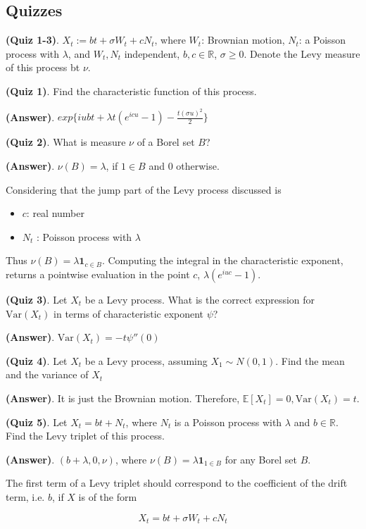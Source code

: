 \documentclass[12pt]{article}
\theoremstyle{nonumberbreak}
\begin{document}
\pagebreak
\subsection*{Quizzes}



\textbf{(Quiz 1-3)}. $X_t := bt + \sigma W_t + c N_t$, where $W_t$: Brownian motion, $N_t$: a Poisson process with $\lambda$, and $W_t, N_t$ independent, $b,c \in \mathbb{R}$, $\sigma \ge 0$. Denote the Levy measure of this process bt $\nu$.  


\textbf{(Quiz 1)}. Find the characteristic function of this process.

\textbf{(Answer)}. $exp \{ iubt + \lambda t (e^{icu} - 1) - \frac{t(\sigma u)^2}{2} \}$


\textbf{(Quiz 2)}. What is measure $\nu$ of a Borel set $B$? 

\textbf{(Answer)}. $\nu(B) = \lambda$, if $1 \in B$ and $0$ otherwise.

Considering that the jump part of the Levy process discussed is

\begin{itemize}
	\item $c$: real number
	\item $N_t$ : Poisson process with $\lambda$
\end{itemize}

Thus $\nu(B) = \lambda \mathbf{1}_{c \in B}$. Computing the integral in the characteristic exponent, returns a pointwise evaluation in the point $c$, $\lambda (e^{iuc} - 1)$.


\textbf{(Quiz 3)}. Let $X_t$ be a Levy process. What is the correct expression for $\mathrm{Var} (X_t)$ in terms of characteristic exponent $\psi$? 

\textbf{(Answer)}. $\mathrm{Var} (X_t) = -t \psi''(0)$


\textbf{(Quiz 4)}. Let $X_t$ be a Levy process, assuming $X_1 \sim N(0,1)$. Find the mean and the variance of $X_t$

\textbf{(Answer)}. It is just the Brownian motion. Therefore, $\mathbb{E} [X_t] = 0, \mathrm{Var} (X_t) = t$.


\textbf{(Quiz 5)}. Let $X_t = bt + N_t$, where $N_t$ is a Poisson process with $\lambda$ and $b \in \mathbb{R}$. Find the Levy triplet of this process. 

\textbf{(Answer)}. $(b + \lambda, 0, \nu)$, where $\nu(B) =\lambda \mathbf{1}_{1 \in B}$ for any Borel set $B$.

The first term of a Levy triplet should correspond to the coefficient of the drift term, i.e. $b$, if $X$ is of the form

$$
X_t = bt + \sigma W_t + c N_t
$$
\end{document}
